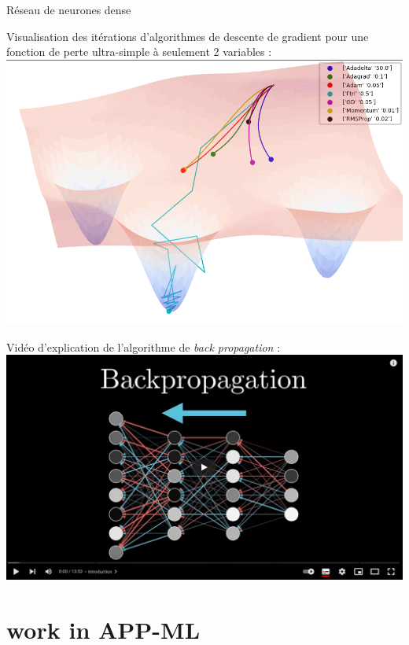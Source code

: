\documentclass[10pt,serif,mathserif,compress,hyperref={colorlinks}]{beamer}
\begin{document}
\begin{frame}{Réseau de neurones dense}

  {\small Visualisation des itérations d'algorithmes de descente de gradient pour une fonction de perte ultra-simple à seulement 2 variables :}\\[2mm]
  \hspace*{25mm}\href{https://github.com/Jaewan-Yun/optimizer-visualization/blob/master/figures/movie9.gif}{\includegraphics[width=.45\textwidth]{images/adam_plot3D_animated.png}}\\[-2mm]

  \medskip
  {\small Vidéo d'explication de l'algorithme de {\em back propagation} :}\\
  \hspace*{30mm}\href{https://www.3blue1brown.com/lessons/backpropagation}{\includegraphics[width=.35\textwidth]{images/video-BackPropagation.png}}
\end{frame}

\section{work in APP-ML}
\end{document}
